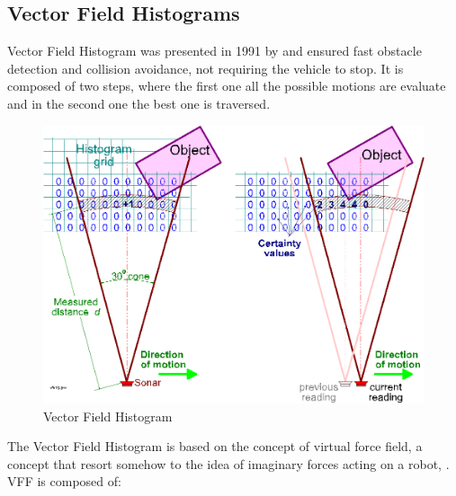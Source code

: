 \subsection{Vector Field Histograms}
Vector Field Histogram was presented in 1991 by \citet{borenstein1991} and ensured fast obstacle detection and collision avoidance, not requiring the vehicle to stop. It is composed of two steps, where the first one all the possible motions are evaluate and in the second one the best one is traversed.
    \begin{figure}[H]
        \centering
        \includegraphics[scale=0.30]{Images/Chapter 4/vff1.png}
        \caption{Vector Field Histogram}
        \label{fig:my_label}
    \end{figure}
The Vector Field Histogram is based on the concept of virtual force field, a concept that resort somehow to the idea of imaginary forces acting on a robot, \citet{1087247}.
VFF is composed of:

